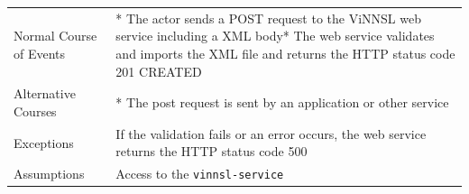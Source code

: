\begin{longtable}[]{@{}ll@{}}
\begin{minipage}[t]{0.27\columnwidth}\raggedright\strut
Normal Course of Events\strut
\end{minipage} & \begin{minipage}[t]{0.68\columnwidth}\raggedright\strut
* The actor sends a POST request to the ViNNSL web service including a
XML body* The web service validates and imports the XML file and returns
the HTTP status code 201 CREATED\strut
\end{minipage}\tabularnewline
\begin{minipage}[t]{0.27\columnwidth}\raggedright\strut
Alternative Courses\strut
\end{minipage} & \begin{minipage}[t]{0.68\columnwidth}\raggedright\strut
* The post request is sent by an application or other service\strut
\end{minipage}\tabularnewline
\begin{minipage}[t]{0.27\columnwidth}\raggedright\strut
Exceptions\strut
\end{minipage} & \begin{minipage}[t]{0.68\columnwidth}\raggedright\strut
If the validation fails or an error occurs, the web service returns the
HTTP status code 500\strut
\end{minipage}\tabularnewline
\begin{minipage}[t]{0.27\columnwidth}\raggedright\strut
Assumptions\strut
\end{minipage} & \begin{minipage}[t]{0.68\columnwidth}\raggedright\strut
Access to the \texttt{vinnsl-service}\strut
\end{minipage}\tabularnewline
\bottomrule
\end{longtable}


